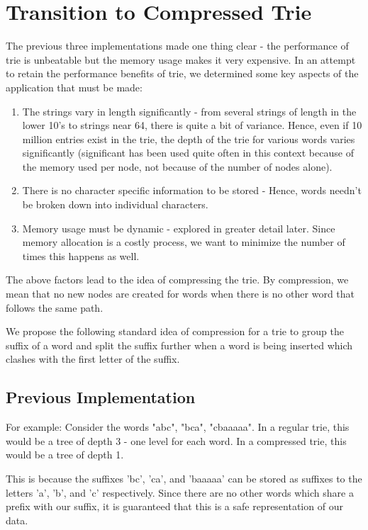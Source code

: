 \documentclass{article}
\begin{document}
\section{Transition to Compressed Trie}

The previous three implementations made one thing clear - the performance of trie is unbeatable but the memory usage makes it very expensive. In an attempt to retain the performance benefits of trie, we determined some key aspects of the application that must be made:

\begin{enumerate}
    \item The strings vary in length significantly - from several strings of length in the lower 10's to strings near 64, there is quite a bit of variance. Hence, even if 10 million entries exist in the trie, the depth of the trie for various words varies significantly (significant has been used quite often in this context because of the memory used per node, not because of the number of nodes alone). 
    \item There is no character specific information to be stored - Hence, words needn't be broken down into individual characters.
    \item Memory usage must be dynamic - explored in greater detail later. Since memory allocation is a costly process, we want to minimize the number of times this happens as well.
\end{enumerate}

The above factors lead to the idea of compressing the trie. By compression, we mean that no new nodes are created for words when there is no other word that follows the same path.

We propose the following standard idea of compression for a trie to group the suffix of a word and split the suffix further when a word is being inserted which clashes with the first letter of the suffix.

\subsection{Previous Implementation}

For example: Consider the words "abc", "bca", "cbaaaaa". In a regular trie, this would be a tree of depth 3 - one level for each word. In a compressed trie, this would be a tree of depth 1. 

This is because the suffixes 'bc', 'ca', and 'baaaaa' can be stored as suffixes to the letters 'a', 'b', and 'c' respectively. Since there are no other words which share a prefix with our suffix, it is guaranteed that this is a safe representation of our data.
\end{document}
